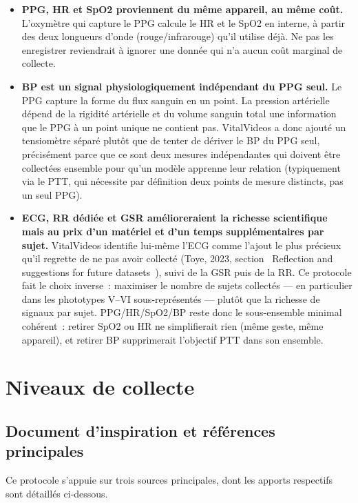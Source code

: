 \documentclass[11pt,a4paper]{article}
\begin{document}
\begin{itemize}
\item \textbf{PPG, HR et SpO2 proviennent du m\^eme appareil, au m\^eme
co\^ut.} L'oxym\`etre qui capture le PPG calcule le HR et le SpO2 en
interne, \`a partir des deux longueurs d'onde (rouge/infrarouge) qu'il
utilise d\'ej\`a. Ne pas les enregistrer reviendrait \`a ignorer une
donn\'ee qui n'a aucun co\^ut marginal de collecte.
\item \textbf{BP est un signal physiologiquement ind\'ependant du PPG
seul.} Le PPG capture la forme du flux sanguin en un point. La pression
art\'erielle d\'epend de la rigidit\'e art\'erielle et du volume sanguin
total une information que le PPG \`a un point unique ne contient pas.
VitalVideos a donc ajout\'e un tensiom\`etre s\'epar\'e plut\^ot que de
tenter de d\'eriver le BP du PPG seul, pr\'ecis\'ement parce que ce sont
deux mesures ind\'ependantes qui doivent \^etre collect\'ees ensemble pour
qu'un mod\`ele apprenne leur relation (typiquement via le PTT, qui
n\'ecessite par d\'efinition deux points de mesure distincts, pas un seul
PPG).
\item \textbf{ECG, RR d\'edi\'ee et GSR amélioreraient la richesse
scientifique mais au prix d'un mat\'eriel et d'un temps suppl\'ementaires
par sujet.} VitalVideos identifie lui-m\^eme l'ECG comme l'ajout le plus
pr\'ecieux qu'il regrette de ne pas avoir collect\'e (Toye, 2023, section
\guillemotleft~Reflection and suggestions for future datasets~\guillemotright),
suivi de la GSR puis de la RR. Ce protocole fait le choix inverse~:
maximiser le nombre de sujets collect\'es --- en particulier dans les
phototypes V--VI sous-repr\'esent\'es --- plut\^ot que la richesse de
signaux par sujet. PPG/HR/SpO2/BP reste donc le sous-ensemble minimal
cohérent~: retirer SpO2 ou HR ne simplifierait rien (m\^eme geste, m\^eme
appareil), et retirer BP supprimerait l'objectif PTT dans son ensemble.
\end{itemize}

\newpage
\section{Niveaux de collecte}

\subsection{Document d'inspiration et r\'ef\'erences principales}

Ce protocole s'appuie sur trois sources principales, dont les apports
respectifs sont d\'etaill\'es ci-dessous.
\end{document}
